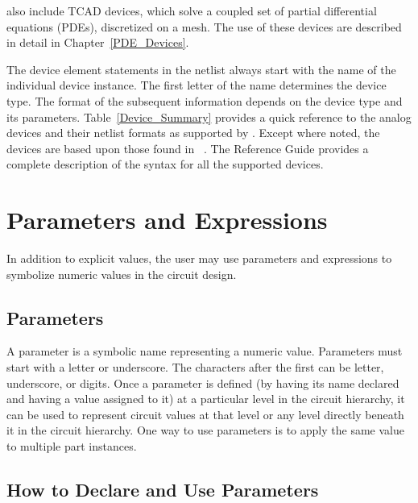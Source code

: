 \Xyce{} also include TCAD devices, which solve a coupled set of partial
differential equations (PDEs), discretized on a mesh. The use of these devices
are described in detail in Chapter~\ref{PDE_Devices}.

The device element statements in the netlist always start with the name of the
individual  device instance. The first letter of the
name determines the device type. The format of the subsequent information
depends on the device type and its parameters.  Table~\ref{Device_Summary}
provides a quick reference to the analog devices and their netlist formats as
supported by \Xyce{}. Except where noted, the devices are based upon those
found in ~\cite{Grove:1967}. The \Xyce{} Reference Guide\ReferenceGuide{}
provides a complete description of the syntax for all the supported devices.



\section{Parameters and Expressions}
\label{Parameters_Expressions}

In addition to explicit values, the user may use parameters and expressions to symbolize numeric values in the circuit design.

\subsection{Parameters}

A parameter is a symbolic name representing a numeric value. Parameters must start with a letter or underscore. The characters after the first can be letter, underscore, or digits. Once a parameter is defined (by having its name declared and having a value assigned to it) at a particular level in the circuit hierarchy, it can be used to represent circuit values at that level or any level directly beneath it in the circuit hierarchy. One way to use parameters is to apply the same value to multiple part instances.


\subsection{How to Declare and Use Parameters}

